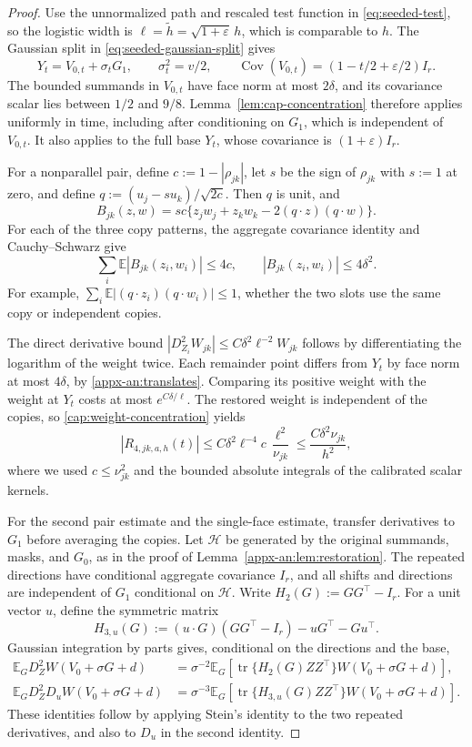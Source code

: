 \documentclass[11pt,letterpaper]{article}
\theoremstyle{remark}
\newcommand{\E}{\mathbb E}
\newcommand{\Cov}{\operatorname{Cov}}
\newcommand{\tr}{\operatorname{tr}}
\begin{document}
\begin{proof}
Use the unnormalized path and rescaled test function in
\eqref{eq:seeded-test}, so the logistic width is
\(\ell=\widetilde h=\sqrt{1+\varepsilon}\,h\), which is comparable
to \(h\). The Gaussian split in
\eqref{eq:seeded-gaussian-split} gives
\[
 Y_t=V_{0,t}+\sigma_tG_1,\qquad
 \sigma_t^2=v/2,\qquad
 \Cov(V_{0,t})=(1-t/2+\varepsilon/2)I_r.
\]
The bounded summands in \(V_{0,t}\) have face norm at most
\(2\delta\), and its covariance scalar lies between \(1/2\) and
\(9/8\). Lemma~\ref{lem:cap-concentration} therefore applies
uniformly in time, including after conditioning on \(G_1\), which
is independent of \(V_{0,t}\). It also applies to the full base
\(Y_t\), whose covariance is \((1+\varepsilon)I_r\).

For a nonparallel pair, define
\(c:=1-|\rho_{jk}|\), let \(s\) be the sign of \(\rho_{jk}\)
with \(s:=1\) at zero, and define
\(q:=(u_j-su_k)/\sqrt{2c}\). Then \(q\) is unit, and
\begin{equation}
 B_{jk}(z,w)=sc\{z_jw_j+z_kw_k-2(q\cdot z)(q\cdot w)\}.
 \label{cap:angle-cancellation}
\end{equation}
For each of the three copy patterns, the aggregate covariance
identity and Cauchy--Schwarz give
\[
 \sum_i\E|B_{jk}(z_i,w_i)|\le4c,
 \qquad |B_{jk}(z_i,w_i)|\le4\delta^2.
\]
For example,
\(\sum_i\E|(q\cdot z_i)(q\cdot w_i)|\le1\), whether the
two slots use the same copy or independent copies.

The direct derivative bound
\( |D_{Z_i}^2W_{jk}|\le C\delta^2\ell^{-2}W_{jk}\)
follows by differentiating the logarithm of the weight twice.
Each remainder point differs from \(Y_t\) by face norm at most
\(4\delta\), by \eqref{appx-an:translates}. Comparing its positive
weight with the weight at \(Y_t\) costs at most
\(e^{C\delta/\ell}\). The restored weight is independent of the
copies, so \eqref{cap:weight-concentration} yields
\[
 |R_{4,jk,a,h}(t)|
 \le C\delta^2\ell^{-4}c\,\frac{\ell^2}{\nu_{jk}}
 \le \frac{C\delta^2\nu_{jk}}{h^2},
\]
where we used \(c\le\nu_{jk}^2\) and the bounded absolute
integrals of the calibrated scalar kernels.

For the second pair estimate and the single-face estimate, transfer
derivatives to \(G_1\) before averaging the copies. Let
\(\mathcal H\) be generated by the original summands, masks, and
\(G_0\), as in the proof of
Lemma~\ref{appx-an:lem:restoration}. The repeated directions
have conditional aggregate covariance \(I_r\), and all shifts
and directions are independent of \(G_1\) conditional on
\(\mathcal H\). Write \(H_2(G):=GG^\top-I_r\). For a unit
vector \(u\), define the symmetric matrix
\[
 H_{3,u}(G):=(u\cdot G)(GG^\top-I_r)-uG^\top-Gu^\top.
\]
Gaussian integration by parts gives, conditional on the directions
and the base,
\begin{align*}
 \E_G D_Z^2W(V_0+\sigma G+d)
 &=\sigma^{-2}\E_G[\tr\{H_2(G)ZZ^\top\}W(V_0+\sigma G+d)],\\
 \E_G D_Z^2D_uW(V_0+\sigma G+d)
 &=\sigma^{-3}\E_G[\tr\{H_{3,u}(G)ZZ^\top\}
                         W(V_0+\sigma G+d)].
\end{align*}
These identities follow by applying Stein's identity to the two
repeated derivatives, and also to \(D_u\) in the second identity.


\end{proof}
\end{document}
